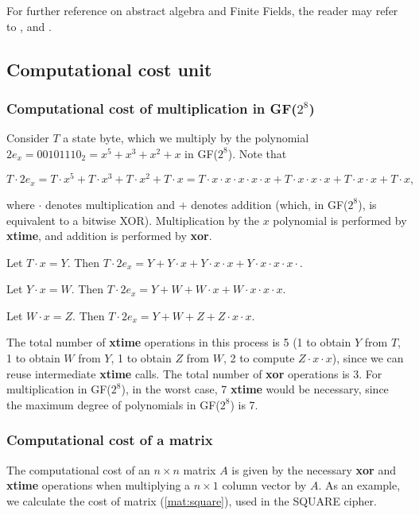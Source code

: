 For further reference on abstract algebra and Finite Fields, the reader may refer to \cite{panario2007topicos}, \cite{panario2013handbook} and \cite{Handbook1996}.

\subsection{Computational cost unit}\label{sec:comp-cost}

\subsubsection{Computational cost of multiplication in GF($2^8$)}
Consider $T$ a state byte, which we multiply by the polynomial $2e_x = 00101110_2 = x^5 + x^3 + x^2 + x$ in GF($2^8$). Note that

$$
T \cdot 2e_x = T \cdot x^5 + T \cdot x^3 + T \cdot x^2 + T \cdot x = T \cdot x \cdot x \cdot x \cdot x \cdot x + T \cdot x \cdot x \cdot x + T \cdot x \cdot x + T \cdot x,
$$

where $\cdot$ denotes multiplication and $+$ denotes addition (which, in GF($2^8$), is equivalent to a bitwise XOR). Multiplication by the $x$ polynomial is performed by \textbf{xtime}, and addition is performed by \textbf{xor}.

Let $T \cdot x = Y$. Then $T \cdot 2e_x = Y + Y \cdot x + Y \cdot x \cdot x + Y \cdot x \cdot x \cdot x \cdot $.

Let $Y \cdot x = W$. Then $T \cdot 2e_x = Y + W + W \cdot x + W \cdot x \cdot x \cdot x$.

Let $W \cdot x = Z$. Then $T \cdot 2e_x = Y + W + Z + Z \cdot x \cdot x$.

The total number of \textbf{xtime} operations in this process is 5 (1 to obtain $Y$ from $T$, 1 to obtain $W$ from $Y$, 1 to obtain $Z$ from $W$, 2 to compute $Z \cdot x \cdot x$), since we can reuse intermediate \textbf{xtime} calls. The total number of \textbf{xor} operations is 3. For multiplication in GF($2^8$), in the worst case, 7 \textbf{xtime} would be necessary, since the maximum degree of polynomials in GF($2^8$) is 7.

\subsubsection{Computational cost of a matrix}
The computational cost of an $n\times n$ matrix $A$ is given by the necessary \textbf{xor} and \textbf{xtime} operations when multiplying a $n\times1$ column vector by $A$. As an example, we calculate the cost of matrix (\ref{mat:square}), used in the SQUARE \cite{SQUARE1997} cipher.

